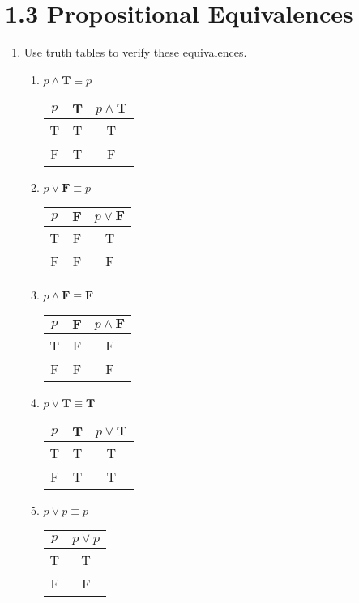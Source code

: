 \documentclass[11pt]{article}
\begin{document}
\section*{\textbf{1.3 Propositional Equivalences}}
\begin{enumerate}[label=\textbf{\arabic*.}]
	\item Use truth tables to verify these equivalences.
	\begin{enumerate}[label=\textbf{\alph*)}]
		\item $p \land \textbf{T} \equiv p$
		
		\begin{tabular}{c | c | c}
			$p$ & $\textbf{T}$ & $p \land \textbf{T}$ \\
			\hline
			T & T & T \\
			F & T & F 
		\end{tabular}
		
		\item $p \lor \textbf{F} \equiv p$
		
		\begin{tabular}{c | c | c}
			$p$ & $\textbf{F}$ & $p \lor \textbf{F}$ \\
			\hline
			T & F & T \\
			F & F & F
		\end{tabular}
		
		\item $p \land \textbf{F} \equiv \textbf{F}$
		
		\begin{tabular}{c | c | c}
			$p$ & $\textbf{F}$ & $p \land \textbf{F}$ \\
			\hline
			T & F & F \\
			F & F & F
		\end{tabular}
		
		\item $p \lor \textbf{T} \equiv \textbf{T}$
		
		\begin{tabular}{c | c | c}
			$p$ & $\textbf{T}$ & $p \lor \textbf{T}$ \\
			\hline
			T & T & T \\
			F & T & T
		\end{tabular}
	
		\item $p \lor p \equiv p$
		
		\begin{tabular}{c | c}
			$p$ & $p \lor p$ \\
			\hline
			T & T \\
			F & F 
		\end{tabular}
		

\end{enumerate}
\end{enumerate}
\end{document}

